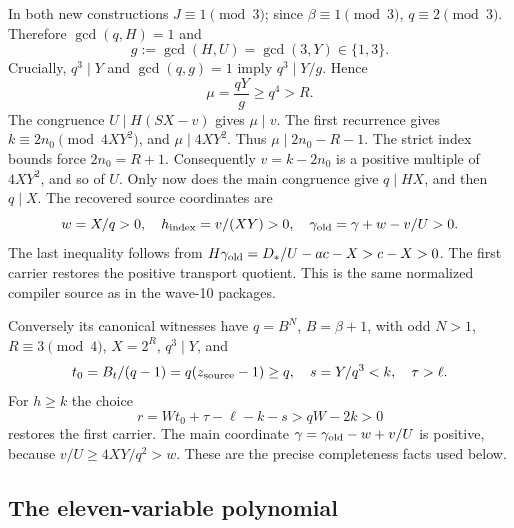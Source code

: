 In both new constructions $J\equiv1\pmod3$; since $\beta\equiv1\pmod3$,
$q\equiv2\pmod3$. Therefore $\gcd(q,H)=1$ and
\[
 g:=\gcd(H,U)=\gcd(3,Y)\in\{1,3\}.
\]
Crucially, $q^3\mid Y$ and $\gcd(q,g)=1$ imply $q^3\mid Y/g$. Hence
\[
 \mu=\frac{qY}{g}\ge q^4>R.
\]
The congruence $U\mid H(SX-v)$ gives $\mu\mid v$. The first recurrence
gives $k\equiv2n_0\pmod{4XY^2}$, and $\mu\mid4XY^2$. Thus
$\mu\mid2n_0-R-1$. The strict index bounds force $2n_0=R+1$.
Consequently $v=k-2n_0$ is a positive multiple of $4XY^2$, and so of $U$.
Only now does the main congruence give $q\mid HX$, and then $q\mid X$.
The recovered source coordinates are
\[
 w=X/q>0,\quad h_{\rm index}=v/(XY)>0,\quad
 \gamma_{\rm old}=\gamma+w-v/U>0.
\]
The last inequality follows from
$H\gamma_{\rm old}=D_*/U-ac-X>c-X>0$.
The first carrier restores the positive transport quotient. This is
the same normalized compiler source as in the wave-10 packages.

Conversely its canonical witnesses have $q=B^N$, $B=\beta+1$, with
odd $N>1$, $R\equiv3\pmod4$, $X=2^R$, $q^3\mid Y$, and
\[
 t_0=B_t/(q-1)=q(z_{\rm source}-1)\ge q,\quad
 s=Y/q^3<k,\quad \tau>\ell.
\]
For $h\ge k$ the choice
\[
 r=Wt_0+\tau-\ell-k-s>qW-2k>0
\]
restores the first carrier. The main coordinate
$\gamma=\gamma_{\rm old}-w+v/U$ is positive, because
$v/U\ge4XY/q^2>w$. These are the precise completeness facts used below.

\subsection{The eleven-variable polynomial}

